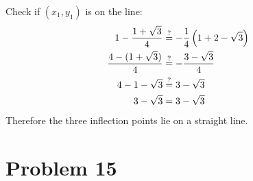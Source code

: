 \documentclass{article}
\newcommand*{\paren}[1]{\ensuremath\left(#1\right)}
\newcommand*{\problem}[1]{\section*{Problem #1}}
\begin{document}
Check if $(x_1,y_1)$ is on the line:
\begin{align*}
	1-\frac{1+\sqrt{3}}{4}&\stackrel{?}{=}-\frac{1}{4}\paren{1+2-\sqrt{3}} \\
	\frac{4-(1+\sqrt{3})}{4}&\stackrel{?}{=}-\frac{3-\sqrt{3}}{4} \\
	4-1-\sqrt{3}&\stackrel{?}{=}3-\sqrt{3} \\
	3-\sqrt{3}&=3-\sqrt{3}
\end{align*}
Therefore the three inflection points lie on a straight line.

\problem{15}
\end{document}
